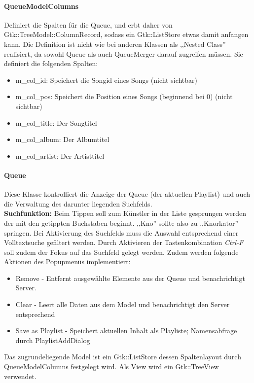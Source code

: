 \paragraph{QueueModelColumns}
Definiert die Spalten für die Queue, und erbt daher von Gtk::TreeModel::ColumnRecord, sodass ein Gtk::ListStore etwas damit anfangen kann.
Die Definition ist nicht wie bei anderen Klassen als ,,Nested Class'' realisiert, da sowohl Queue als auch QueueMerger darauf zugreifen müssen. 
Sie definiert die folgenden Spalten:
\begin{itemize}
\item m\_col\_id: Speichert die Songid eines Songs (nicht sichtbar)
\item m\_col\_pos: Speichert die Position eines Songs (beginnend bei 0) (nicht sichtbar)
\item m\_col\_title: Der Songtitel
\item m\_col\_album: Der Albumtitel
\item m\_col\_artist: Der Artisttitel
\end{itemize}

\paragraph{Queue}
Diese Klasse kontrolliert die Anzeige der Queue (der aktuellen Playlist) und auch die Verwaltung des darunter liegenden Suchfelds.
\\
\textbf{Suchfunktion:} Beim Tippen soll zum Künstler in der Liste gesprungen werden der mit den getippten Buchstaben beginnt.
,,Kno'' sollte also zu ,,Knorkator'' springen. Bei Aktivierung des Suchfelds muss die Auswahl entsprechend einer Volltextsuche gefiltert werden. Durch Aktivieren der Tastenkombination \textit{Ctrl-F} soll zudem der Fokus auf das Suchfeld gelegt werden.
Zudem werden folgende Aktionen des Popupmenüs implementiert:
\begin{itemize}
\item Remove - Entfernt ausgewählte Elemente aus der Queue und benachrichtigt Server.
\item Clear - Leert alle Daten aus dem Model und benachrichtigt den Server entsprechend
\item Save as Playlist - Speichert aktuellen Inhalt als Playliste; Namensabfrage durch PlaylistAddDialog
\end{itemize}

Das zugrundeliegende Model ist ein Gtk::ListStore dessen Spaltenlayout durch QueueModelColumns festgelegt wird.
Als View wird ein Gtk::TreeView verwendet.

